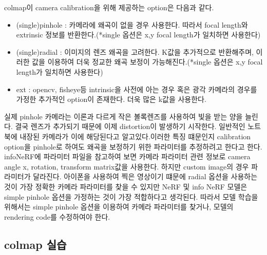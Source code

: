\documentclass{vipweekly}
\begin{document}
colmap이 camera calibration을 위해 제공하는 option은 다음과 같다.


\begin{itemize}
    \item (single)pinhole : 카메라에 왜곡이 없을 경우 사용한다. 따라서 focal length와 extrinsic 정보를 반환한다.(*single 옵션은 x,y focal length가 일치하면 사용한다)
    \item (single)radial : 이미지의 렌즈 왜곡을 고려한다. K값을 추가적으로 반환해주며, 이러한 값을 이용하여 더욱 정교한 왜곡 보정이 가능해진다.(*single 옵션은 x,y focal length가 일치하면 사용한다)
    \item ext : opencv, fisheye등 intrinsic을 사전에 아는 경우 혹은 광각 카메라의 경우를 가정한 추가적인 option이 존재한다. 더욱 많은 k값을 사용한다.
\end{itemize}

실제 pinhole 카메라는 이론과 다르게 작은 볼록렌즈를 사용하여 빛을 받는 양을 늘린다. 
결국 렌즈가 추가되기 때문에 이제 distortion이 발생하기 시작한다. 
일반적인 노트북에 내장된 카메라가 이에 해당된다고 알고있다.이러한 특징 떄문인지
calibration option을 pinhole로 하여도 왜곡을 보정하기 위한 파라미터를 추정하려고 한다고 한다.
infoNeRF에 파라미터 파일을 참고하여 보면 카메라 파라미터 관련 정보로 camera angle x, rotation, transform matrix값을 사용한다. 
하지만 custom image의 경우 파라미터가 달라진다. 
아이폰을 사용하여 찍은 영상이기 떄문에 radial 옵션을 사용하는 것이 가장 정확한 카메라 파라미터를 찾을 수 있지만
NeRF 및 info NeRF 모델은 simple pinhole 옵션을 가정하는 것이 가장 적합하다고 생각된다. 
따라서 모델 학습을 위해서는 simple pinhole 옵션을 이용하여 카메라 파라미터를 찾거나, 모델의 rendering code를 
수정하여야 한다.



\subsection{colmap 실습} 
\end{document}
